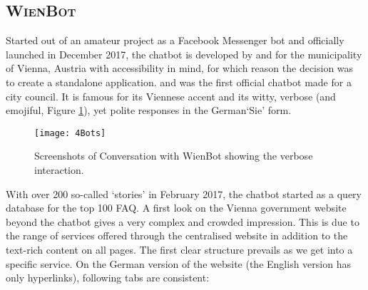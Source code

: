 \subsection*{\textsc{WienBot}}
Started out of an amateur project as a Facebook Messenger bot and officially launched in December 2017, the chatbot is developed by and for the municipality of Vienna, Austria with accessibility in mind, for which reason the decision was to create a standalone application. %
and was the first official chatbot made for a city council. It is famous for its Viennese accent and its witty, verbose (and emojiful, Figure \ref{wienbot:introscreenshots}), yet polite responses in the German`Sie' form.




\begin{figure}[H]

	\caption[Conversation with WienBot]{Screenshots of Conversation with WienBot showing the verbose interaction.}
	\label{wienbot:introscreenshots}
	\texttt{[image: 4Bots]}
\end{figure}

With over 200 so-called `stories' in February 2017, the chatbot started as a query database for the top 100 FAQ.
A first look on the Vienna government website beyond the chatbot gives a very complex and crowded impression. This is due to the range of services offered through the centralised website in addition to the text-rich content on all pages. The first clear structure prevails as we get into a specific service. On the German version of the website (the English version has only hyperlinks), following tabs are consistent:



